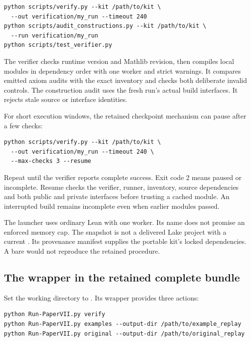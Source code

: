 \begin{Verbatim}[fontsize=\small,breaklines=true,breakanywhere=true]
python scripts/verify.py --kit /path/to/kit \
  --out verification/my_run --timeout 240
python scripts/audit_constructions.py --kit /path/to/kit \
  --run verification/my_run
python scripts/test_verifier.py
\end{Verbatim}

The verifier checks runtime version and Mathlib revision, then compiles local modules in dependency order with one worker and strict warnings. It compares emitted axiom audits with the exact inventory and checks both deliberate invalid controls. The construction audit uses the fresh run's actual build interfaces. It rejects stale source or interface identities.

For short execution windows, the retained checkpoint mechanism can pause after a few checks:

\begin{Verbatim}[fontsize=\small,breaklines=true,breakanywhere=true]
python scripts/verify.py --kit /path/to/kit \
  --out verification/my_run --timeout 240 \
  --max-checks 3 --resume
\end{Verbatim}

Repeat until the verifier reports complete success. Exit code 2 means paused or incomplete. Resume checks the verifier, runner, inventory, source dependencies and both public and private interfaces before trusting a cached module. An interrupted build remains incomplete even when earlier modules passed.

The  launcher uses ordinary Lean with one worker. Its name does not promise an enforced memory cap. The snapshot is not a delivered Lake project with a current . Its provenance manifest supplies the portable kit's locked dependencies. A bare  would not reproduce the retained procedure.

\subsection{The wrapper in the retained complete bundle}
Set the working directory to . Its wrapper provides three actions:

\begin{Verbatim}[fontsize=\small,breaklines=true,breakanywhere=true]
python Run-PaperVII.py verify
python Run-PaperVII.py examples --output-dir /path/to/example_replay
python Run-PaperVII.py original --output-dir /path/to/original_replay
\end{Verbatim}

